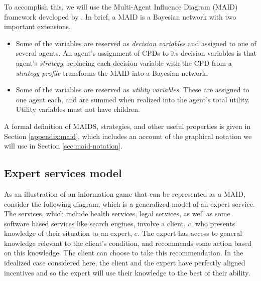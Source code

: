 \documentclass[../thesis.tex]{subfiles}
\begin{document}
To accomplish this, we will use the Multi-Agent Influence Diagram
(MAID) framework developed by \cite{koller2003multi}.
In brief, a MAID is a Bayesian network with two important
extensions.

\begin{itemize}
\item Some of the variables are reserved as \emph{decision variables}
  and assigned to one of several agents.
  An agent's assignment of CPDs to its decision variables is
  that agent's \emph{strategy}; replacing each decision variable
  with the CPD from a \emph{strategy profile} transforms the MAID
  into a Bayesian network.
\item Some of the variables are reserved as \emph{utility variables}.
  These are assigned to one agent each, and are summed when realized
  into the agent's total utility.
  Utility variables must not have children.
\end{itemize}

A formal definition of MAIDS, strategies, and other useful
properties is given in Section \ref{appendix:maid},
which includes an account of the graphical notation we
will use in Section \ref{sec:maid-notation}.

\subsection{Expert services model}

As an illustration of an information game
that can be represented as a MAID, consider the
following diagram, which is a generalized model of
an expert service.
The services, which include health services, legal services,
as well as some software based services like search engines,
involve a client, $c$, who presents knowledge of their situation
to an expert, $e$.
The expert has access to general knowledge relevant to the
client's condition, and recommends some action based on
this knowledge.
The client can choose to take this recommendation.
In the idealized case considered here, the client
and the expert have perfectly aligned incentives and
so the expert will use their knowledge to the best
of their ability.

\begin{center}
\end{center}
\end{document}

